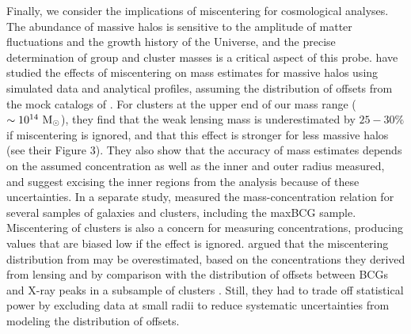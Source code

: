 \documentclass[12pt]{emulateapj}
\begin{document}
Finally, we consider the implications of miscentering for cosmological
analyses. The abundance of massive halos is sensitive to the amplitude
of matter fluctuations and the growth history of the Universe, and the
precise determination of group and cluster masses is a critical aspect
of this probe. \citet{Mandelbaum2010} have studied the effects of
miscentering on mass estimates for massive halos using simulated data
and analytical profiles, assuming the distribution of offsets from the
mock catalogs of \citet{Johnston2007b}. For clusters at the upper end
of our mass range ($\sim10^{14}~\rm{M}_{\odot}$), they find that the
weak lensing mass is underestimated by $25-30\%$ if miscentering is
ignored, and that this effect is stronger for less massive halos (see
their Figure 3). They also show that the accuracy of mass estimates
depends on the assumed concentration as well as the inner and outer
radius measured, and suggest excising the inner regions from the
analysis because of these uncertainties. In a separate study,
\citet{Mandelbaum2008} measured the mass-concentration relation for
several samples of galaxies and clusters, including the maxBCG
sample. Miscentering of clusters is also a concern for measuring
concentrations, producing values that are biased low if the effect is
ignored. \citet{Mandelbaum2008} argued that the miscentering
distribution from \citet{Johnston2007b} may be overestimated, based on
the concentrations they derived from lensing and by comparison with the
distribution of offsets between BCGs and X-ray peaks in a subsample of
clusters \citep{Koester2007b}. Still, they had to trade off statistical
power by excluding data at small radii to reduce systematic
uncertainties from modeling the distribution of offsets.
\end{document}
